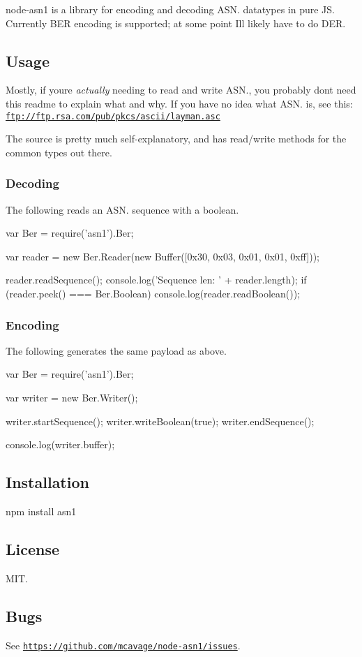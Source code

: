 node-\/asn1 is a library for encoding and decoding A\+S\+N. datatypes in pure J\+S. Currently B\+E\+R encoding is supported; at some point I\textquotesingle{}ll likely have to do D\+E\+R.

\subsection*{Usage}

Mostly, if you\textquotesingle{}re {\itshape actually} needing to read and write A\+S\+N., you probably don\textquotesingle{}t need this readme to explain what and why. If you have no idea what A\+S\+N. is, see this\+: \href{ftp://ftp.rsa.com/pub/pkcs/ascii/layman.asc}{\tt ftp\+://ftp.\+rsa.\+com/pub/pkcs/ascii/layman.\+asc}

The source is pretty much self-\/explanatory, and has read/write methods for the common types out there.

\subsubsection*{Decoding}

The following reads an A\+S\+N. sequence with a boolean. \begin{DoxyVerb}var Ber = require('asn1').Ber;

var reader = new Ber.Reader(new Buffer([0x30, 0x03, 0x01, 0x01, 0xff]));

reader.readSequence();
console.log('Sequence len: ' + reader.length);
if (reader.peek() === Ber.Boolean)
  console.log(reader.readBoolean());
\end{DoxyVerb}


\subsubsection*{Encoding}

The following generates the same payload as above. \begin{DoxyVerb}var Ber = require('asn1').Ber;

var writer = new Ber.Writer();

writer.startSequence();
writer.writeBoolean(true);
writer.endSequence();

console.log(writer.buffer);
\end{DoxyVerb}


\subsection*{Installation}

\begin{DoxyVerb}npm install asn1
\end{DoxyVerb}


\subsection*{License}

M\+I\+T.

\subsection*{Bugs}

See \href{https://github.com/mcavage/node-asn1/issues}{\tt https\+://github.\+com/mcavage/node-\/asn1/issues}. 